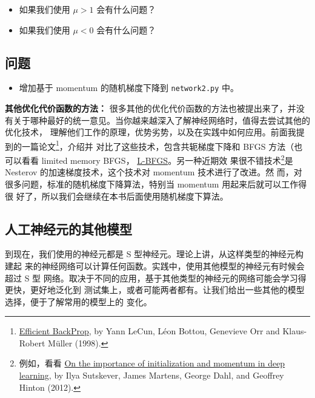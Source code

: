 \begin{itemize}
\item 如果我们使用 $\mu > 1$ 会有什么问题？
\item 如果我们使用 $\mu < 0$ 会有什么问题？
\end{itemize}

\subsection*{问题}

\begin{itemize}
\item 增加基于 momentum 的随机梯度下降到 \lstinline!network2.py! 中。
\end{itemize}

\textbf{其他优化代价函数的方法：} 很多其他的优化代价函数的方法也被提出来了，并没
有关于哪种最好的统一意见。当你越来越深入了解神经网络时，值得去尝试其他的优化技术，
理解他们工作的原理，优势劣势，以及在实践中如何应用。前面我提到的一篇论文\footnote{\href{http://yann.lecun.com/exdb/publis/pdf/lecun-98b.pdf}{Efficient BackProp}, by Yann LeCun, Léon Bottou, Genevieve Orr and Klaus-Robert Müller (1998).}，介绍并
对比了这些技术，包含共轭梯度下降和 BFGS 方法（也可以看看 limited memory BFGS，
  \href{http://en.wikipedia.org/wiki/Limited-memory_BFGS}{L-BFGS}。另一种近期效
  果很不错技术\footnote{例如，看看 \href{http://www.cs.toronto.edu/~hinton/absps/momentum.pdf}{On the importance of initialization and momentum in deep learning}, by Ilya Sutskever, James Martens, George Dahl, and Geoffrey Hinton (2012).}是 Nesterov 的加速梯度技术，这个技术对 momentum 技术进行了改进。然
  而，对很多问题，标准的随机梯度下降算法，特别当 momentum 用起来后就可以工作得很
  好了，所以我们会继续在本书后面使用随机梯度下算法。

\subsection{人工神经元的其他模型}
\label{subsec:other_models_of_artificial_neuron}

到现在，我们使用的神经元都是 S 型神经元。理论上讲，从这样类型的神经元构建起
来的神经网络可以计算任何函数。实践中，使用其他模型的神经元有时候会超过 S 型
网络。取决于不同的应用，基于其他类型的神经元的网络可能会学习得更快，更好地泛化到
测试集上，或者可能两者都有。让我们给出一些其他的模型选择，便于了解常用的模型上的
变化。

